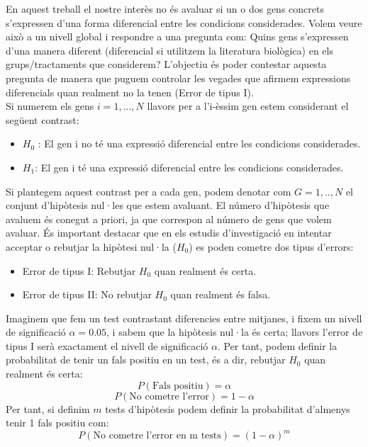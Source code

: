 \documentclass[english]{article}
\begin{document}
En aquest treball el nostre interès no és avaluar si un o dos gens concrets s'expressen d'una forma diferencial entre les condicions considerades. Volem veure això a un nivell global i respondre a una pregunta com: Quins gens s'expressen d'una manera diferent (diferencial si utilitzem la literatura biològica) en els grups/tractaments que considerem? L'objectiu és poder contestar aquesta pregunta de manera que puguem controlar les vegades que afirmem expressions diferencials quan realment no la tenen (Error de tipus I).
\\

Si numerem els gens $i = 1,...,N$ llavors per a l'i-èssim gen estem considerant el següent contrast:
\begin{itemize}
\item $H_{0}$ : El gen i no té una expressió diferencial entre les condicions considerades.
\item $H_{1}$: El gen i té una expressió diferencial entre les condicions considerades.
\end{itemize}
Si plantegem aquest contrast per a cada gen, podem denotar com $G={1,..,N}$ el conjunt d'hipòtesis nul·les que estem avaluant. El número d'hipòtesis que avaluem és conegut a priori, ja que correspon al número de gens que volem avaluar. És important destacar que en els estudis d'investigació en intentar acceptar o rebutjar la hipòtesi nul·la ($H_{0}$) es poden cometre dos tipus d'errors:
\begin{itemize}
\item Error de tipus I: Rebutjar $H_{0}$ quan realment és certa.
\item Error de tipus II: No rebutjar $H_{0}$ quan realment és falsa.
\end{itemize}
Imaginem que fem un test contrastant diferencies entre mitjanes, i fixem un nivell de significació $\alpha=0.05$, i sabem que la hipòtesis nul·la és certa; llavors l'error de tipus I serà exactament el nivell de significació $\alpha$. Per tant, podem definir la probabilitat de tenir un fals positiu en un test, és a dir, rebutjar $H_{0}$ quan realment és certa:
\begin{equation*}
P(\text{Fals positiu}) = \alpha
\end{equation*}
\begin{equation*}
P(\text{No cometre l'error}) = 1 - \alpha
\end{equation*}
Per tant, si definim $m$ tests d'hipòtesis podem definir la probabilitat d'almenys tenir 1 fals positiu com:
\begin{equation*}
P(\text{No cometre l'error en m tests}) = (1 - \alpha)^m
\end{equation*}
\end{document}
